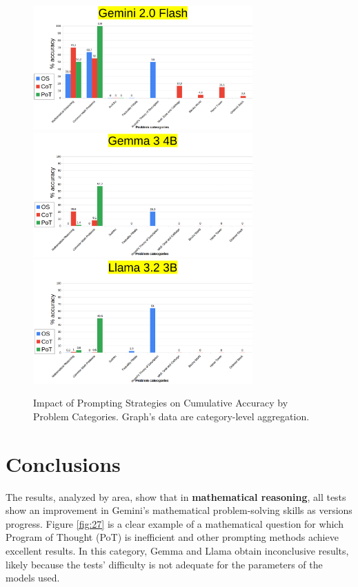 \documentclass[12pt]{article}
\begin{document}
\begin{figure}[H]
    \centering
            \includegraphics[width=0.75\textwidth]{MyGemini2Flash.png}
            \includegraphics[width=0.75\textwidth]{MyGemma3_8BBenchmarks.png}
            \includegraphics[width=0.75\textwidth]{MyLlama3_2_3B.png}
    \caption[My benchmark: accuracy by question category]{Impact of Prompting Strategies on Cumulative Accuracy by Problem Categories. Graph's data are category-level aggregation.}
    \label{fig:finalBench}
    \end{figure} 

\clearpage
\section{Conclusions}
The results, analyzed by area, show that in \textbf{mathematical reasoning}, all tests show an improvement in Gemini's mathematical problem-solving skills as versions progress. 
Figure \ref{fig:27} is a clear example of a mathematical question for which Program of Thought (PoT) is inefficient and other prompting methods achieve excellent results.
In this category, Gemma and Llama obtain inconclusive results, likely  because the tests' difficulty is not adequate for the parameters of the models used.
\end{document}
